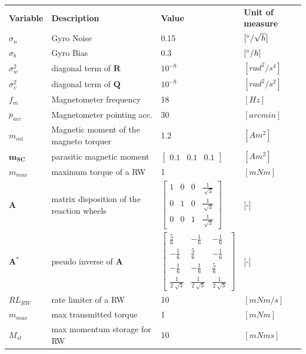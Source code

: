 \documentclass[11pt]{article}
\begin{document}
\begin{table}[H]
\centering
 \begin{tabular}{|M{2cm}|M{5cm}|M{6cm}|M{2cm}|}
\hline
  \textbf{Variable} & \textbf{Description} & \textbf{Value} & \textbf{Unit of measure}\\

\hhline{|=|=|=|=|}
$\sigma_n$ & Gyro Noise  & 0.15 & $[\degree/ \sqrt{h}]$\\
\hline
$\sigma_b$ & Gyro Bias  & 0.3 & $[\degree/ h]$\\
\hline
$\sigma_w^2$ & diagonal term of $\mathbf{R}$  & $10^{-8}$ & $[rad^2/s^4]$\\
\hline
$\sigma_v^2$ & diagonal term of $\mathbf{Q}$  & $10^{-8}$ & $[rad^2/s^2]$\\
\hline
$f_m$ &  Magnetometer frequency & 18 & $[Hz]$\\
\hline
$p_{acc}$ & Magnetometer pointing acc.  & 30 & $[arcmin]$\\
\hline
$m_{mt}$ & Magnetic moment of the magneto torquer & 1.2 & $[Am^2]$ \\
\hline
$\mathbf{m_{SC}}$ & parasitic magnetic moment  & $\begin{bmatrix}
0.1 & 0.1 & 0.1 
\end{bmatrix}$ & $[Am^2]$\\
\hline
$m_{max}$ & maximum  torque of a RW & 1 & $[mNm]$\\
\hline
$\mathbf{A}$& matrix disposition of the reaction wheels &$\begin{bmatrix}
1&0&0&\frac{1}{\sqrt[]{3}}\\
0&1&0&\frac{1}{\sqrt[]{3}}\\
0&0&1&\frac{1}{\sqrt[]{3}}
\end{bmatrix}$& [-]\\
\hline
$\mathbf{A^*}$ & pseudo inverse of $\mathbf{A}$ & $\begin{bmatrix}
\frac{5}{6}&-\frac{1}{6}&-\frac{1}{6}\\
-\frac{1}{6}&\frac{5}{6}&-\frac{1}{6}\\
-\frac{1}{6}&-\frac{1}{6}&\frac{5}{6}\\
\frac{1}{2\sqrt[]{3}}&\frac{1}{2\sqrt[]{3}}&\frac{1}{2\sqrt[]{3}}
\end{bmatrix}$& [-]\\
\hline
$RL_{RW}$ & rate limiter of a RW & 10 & $[mNm/s]$\\
\hline
$m_{max}$ & max transmitted torque & 1 & $[mNm]$\\
\hline
$M_{st}$& max momentum storage for RW & 10 & $[mNms]$\\

\end{tabular}
\end{table}
\end{document}
